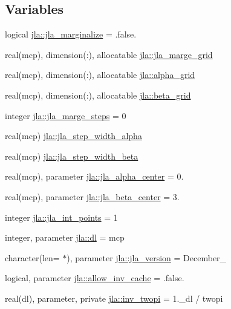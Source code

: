 \subsection*{Variables}
\begin{DoxyCompactItemize}
\item 
logical \mbox{\hyperlink{namespacejla_af9daaf320a7953866d9f29f7f569fbe4}{jla\+::jla\+\_\+marginalize}} = .false.
\item 
real(mcp), dimension(\+:), allocatable \mbox{\hyperlink{namespacejla_a9dc22edc44b8361f9204d217df48cd90}{jla\+::jla\+\_\+marge\+\_\+grid}}
\item 
real(mcp), dimension(\+:), allocatable \mbox{\hyperlink{namespacejla_a1b7511f05dabf960a434da4444f44b88}{jla\+::alpha\+\_\+grid}}
\item 
real(mcp), dimension(\+:), allocatable \mbox{\hyperlink{namespacejla_a105d58f143e8da2dc75625cfaeed54e7}{jla\+::beta\+\_\+grid}}
\item 
integer \mbox{\hyperlink{namespacejla_abdf521613e95b6b0873dc07e2182f08c}{jla\+::jla\+\_\+marge\+\_\+steps}} = 0
\item 
real(mcp) \mbox{\hyperlink{namespacejla_a1b8ab5c356e2c83f267f757196a4a1d2}{jla\+::jla\+\_\+step\+\_\+width\+\_\+alpha}}
\item 
real(mcp) \mbox{\hyperlink{namespacejla_adbfc26690b5ccc65be262cc876cb3bc0}{jla\+::jla\+\_\+step\+\_\+width\+\_\+beta}}
\item 
real(mcp), parameter \mbox{\hyperlink{namespacejla_a4556268c3d45127055caae2fcea446fc}{jla\+::jla\+\_\+alpha\+\_\+center}} = 0.
\item 
real(mcp), parameter \mbox{\hyperlink{namespacejla_a9a9c2c6948ab744eed4e350dad8715bc}{jla\+::jla\+\_\+beta\+\_\+center}} = 3.
\item 
integer \mbox{\hyperlink{namespacejla_a11ab12ec846d481127e505fb14a88ab3}{jla\+::jla\+\_\+int\+\_\+points}} = 1
\item 
integer, parameter \mbox{\hyperlink{namespacejla_a3aa6435b4e08f1d532390186ac608741}{jla\+::dl}} = mcp
\item 
character(len= $\ast$), parameter \mbox{\hyperlink{namespacejla_a9facfef6576a64d9e5b180caec42ea7d}{jla\+::jla\+\_\+version}} = \textquotesingle{}December\+\_\textquotesingle{}
\item 
logical, parameter \mbox{\hyperlink{namespacejla_a5032684691d0e984e5aa1cbdc55795f7}{jla\+::allow\+\_\+inv\+\_\+cache}} = .false.
\item 
real(dl), parameter, private \mbox{\hyperlink{namespacejla_a3f2ed7b8048c2f4dd93374020335944f}{jla\+::inv\+\_\+twopi}} = 1.\+\_\+dl / twopi

\end{DoxyCompactItemize}

